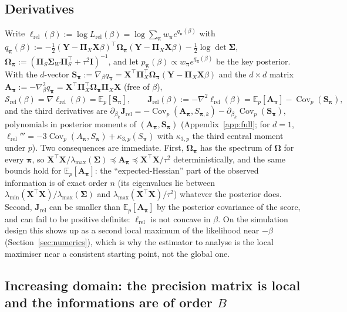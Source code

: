 \documentclass[11pt]{article}
\theoremstyle{definition}
\newcommand{\bX}{\mathbf{X}}
\newcommand{\bY}{\mathbf{Y}}
\newcommand{\bS}{\mathbf{S}}
\newcommand{\bI}{\mathbf{I}}
\newcommand{\bSig}{\boldsymbol{\Sigma}}
\newcommand{\bOm}{\boldsymbol{\Omega}}
\newcommand{\bpi}{\boldsymbol{\pi}}
\newcommand{\bPi}{\boldsymbol{\Pi}}
\newcommand{\E}{\mathbb{E}}
\newcommand{\Cov}{\operatorname{Cov}}
\newcommand{\rel}{\mathrm{rel}}
\begin{document}
\subsection{Derivatives}
Write $\ell_\rel(\beta):=\log L_\rel(\beta)=\log\sum_{\bpi}w_{\bpi}e^{q_{\bpi}(\beta)}$ with $q_{\bpi}(\beta):=-\tfrac12(\bY-\bPi_X\bX\beta)^\top\bOm_{\bpi}(\bY-\bPi_X\bX\beta)-\tfrac12\log\det\bSig$, $\bOm_{\bpi}:=(\bPi_S\bSig_W\bPi_S^\top+\tau^2\bI)^{-1}$, and let $p_{\bpi}(\beta)\propto w_{\bpi}e^{q_{\bpi}(\beta)}$ be the key posterior. With the $d$-vector $\bS_{\bpi}:=\nabla_\beta q_{\bpi}=\bX^\top\bPi_X^\top\bOm_{\bpi}(\bY-\bPi_X\bX\beta)$ and the $d\times d$ matrix $\mathbf A_{\bpi}:=-\nabla^2_\beta q_{\bpi}=\bX^\top\bPi_X^\top\bOm_{\bpi}\bPi_X\bX$ (free of $\beta$),
\begin{equation}\label{eq:derivs}
\bm{\mathcal S}_\rel(\beta)=\nabla\ell_\rel(\beta)=\E_{p}[\bS_{\bpi}],\qquad \mathbf J_\rel(\beta):=-\nabla^2\ell_\rel(\beta)=\E_{p}[\mathbf A_{\bpi}]-\Cov_{p}(\bS_{\bpi}),
\end{equation}
and the third derivatives are $\partial_{\beta_k}\mathbf J_\rel=-\Cov_p(\mathbf A_{\bpi},S_{\bpi,k})-\partial_{\beta_k}\Cov_p(\bS_{\bpi})$, polynomials in posterior moments of $(\mathbf A_{\bpi},\bS_{\bpi})$ (Appendix~\ref{app:full}; for $d=1$, $\ell_\rel'''=-3\Cov_p(A_{\bpi},S_{\bpi})+\kappa_{3,p}(S_{\bpi})$ with $\kappa_{3,p}$ the third central moment under $p$). Two consequences are immediate. First, $\bOm_{\bpi}$ has the spectrum of $\bOm$ for every $\bpi$, so $\bX^\top\bX/\lambda_{\max}(\bSig)\preceq\mathbf A_{\bpi}\preceq\bX^\top\bX/\tau^2$ deterministically, and the same bounds hold for $\E_p[\mathbf A_{\bpi}]$: the ``expected-Hessian'' part of the observed information is of exact order $n$ (its eigenvalues lie between $\lambda_{\min}(\bX^\top\bX)/\lambda_{\max}(\bSig)$ and $\lambda_{\max}(\bX^\top\bX)/\tau^2$) whatever the posterior does. Second, $\mathbf J_\rel$ can be smaller than $\E_p[\mathbf A_{\bpi}]$ by the posterior covariance of the score, and can fail to be positive definite: $\ell_\rel$ is not concave in $\beta$. On the simulation design this shows up as a second local maximum of the likelihood near $-\beta$ (Section~\ref{sec:numerics}), which is why the estimator to analyse is the local maximiser near a consistent starting point, not the global one.

\subsection{Increasing domain: the precision matrix is local and the informations are of order $B$}
\end{document}
